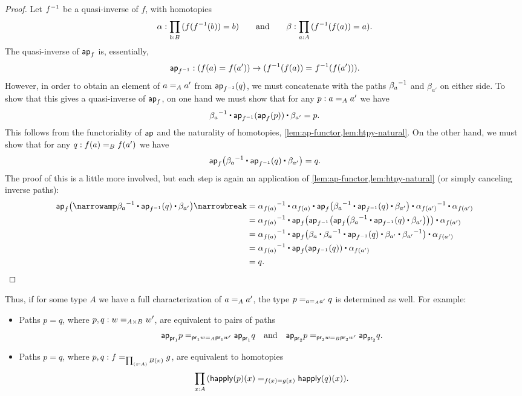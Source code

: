 \begin{proof}
  Let $\opp f$ be a quasi-inverse of $f$, with homotopies
  \begin{equation*}
    \alpha:\prd{b:B} (f(\opp f(b))=b)
    \qquad\text{and}\qquad
    \beta:\prd{a:A} (\opp f(f(a)) = a).
  \end{equation*}
  The quasi-inverse of $\apfunc{f}$ is, essentially,
  \[\apfunc{\opp f} : (\id{f(a)}{f(a')}) \to (\id{\opp f(f(a))}{\opp f(f(a'))}).\]
  However, in order to obtain an element of $\id[A]{a}{a'}$ from $\apfunc{\opp f}(q)$, we must concatenate with the paths $\opp{\beta_a}$ and $\beta_{a'}$ on either side.
  To show that this gives a quasi-inverse of $\apfunc{f}$, on one hand we must show that for any $p:\id[A]{a}{a'}$ we have
  \[ \opp{\beta_a} \ct \apfunc{\opp f}(\apfunc{f}(p)) \ct \beta_{a'} = p. \]
  This follows from the functoriality of $\apfunc{}$ and the naturality of homotopies, \cref{lem:ap-functor,lem:htpy-natural}.
  On the other hand, we must show that for any $q:\id[B]{f(a)}{f(a')}$ we have
  \[ \apfunc{f}\big( \opp{\beta_a} \ct \apfunc{\opp f}(q) \ct \beta_{a'} \big) = q. \]
  The proof of this is a little more involved, but each step is again an application of \cref{lem:ap-functor,lem:htpy-natural} (or simply canceling inverse paths):
  \begin{align*}
    \apfunc{f}\big( \narrowamp\opp{\beta_a} \ct \apfunc{\opp f}(q) \ct \beta_{a'} \big) \narrowbreak
    &= \opp{\alpha_{f(a)}} \ct {\alpha_{f(a)}} \ct
    \apfunc{f}\big( \opp{\beta_a} \ct \apfunc{\opp f}(q) \ct \beta_{a'} \big)
    \ct \opp{\alpha_{f(a')}} \ct {\alpha_{f(a')}}\\
    &= \opp{\alpha_{f(a)}} \ct
    \apfunc f \big(\apfunc{\opp f}\big(\apfunc{f}\big( \opp{\beta_a} \ct \apfunc{\opp f}(q) \ct \beta_{a'} \big)\big)\big)
    \ct {\alpha_{f(a')}}\\
    &= \opp{\alpha_{f(a)}} \ct
    \apfunc f \big(\beta_a \ct \opp{\beta_a} \ct \apfunc{\opp f}(q) \ct \beta_{a'} \ct \opp{\beta_{a'}} \big)
    \ct {\alpha_{f(a')}}\\
    &= \opp{\alpha_{f(a)}} \ct
    \apfunc f (\apfunc{\opp f}(q))
    \ct {\alpha_{f(a')}}\\
    &= q.\qedhere
  \end{align*}
\end{proof}

Thus, if for some type $A$ we have a full characterization of $\id[A]{a}{a'}$, the type $\id[{\id[A]{a}{a'}}]{p}{q}$ is determined as well.
For example:
\begin{itemize}
\item Paths $p = q$, where $p,q : \id[A \times B]{w}{w'}$, are equivalent to pairs of paths
  \[\id[{\id[A]{\proj{1} w}{\proj{1} w'}}]{\projpath{1}{p}}{\projpath{1}{q}}
  \quad\text{and}\quad
  \id[{\id[B]{\proj{2} w}{\proj{2} w'}}]{\projpath{2}{p}}{\projpath{2}{q}}.
  \]
\item Paths $p = q$, where $p,q : \id[\prd{x:A} B(x)]{f}{g}$, are equivalent to homotopies
  \[\prd{x:A} (\id[f(x)=g(x)] {\happly(p)(x)}{\happly(q)(x)}).\]
\end{itemize}


